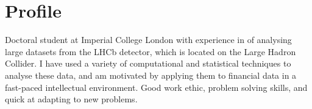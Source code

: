 
\section{Profile}
\cvline{}{}
{
  Doctoral student at Imperial College London with experience in of analysing large datasets
  from the LHCb detector, which is located on the Large Hadron Collider.
  I have used a variety of computational and statistical techniques to analyse these data, and am
  motivated by applying them to financial data in a fast-paced intellectual environment.
  Good work ethic, problem solving skills, and quick at adapting to new problems.
}
















